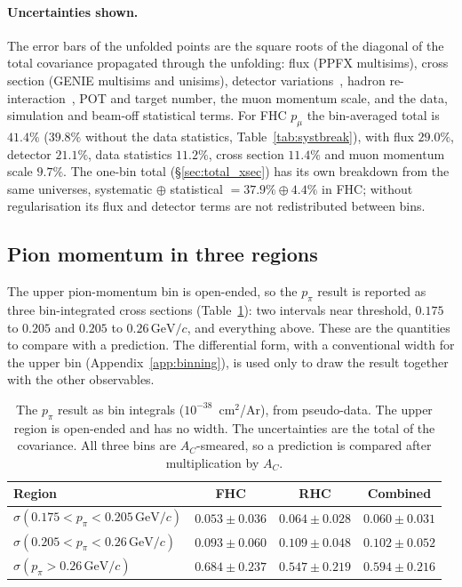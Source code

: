\documentclass[11pt,a4paper]{article}
\newcommand{\GeVc}{\,\text{GeV}\!/c}
\begin{document}
\paragraph{Uncertainties shown.}
The error bars of the unfolded points are the square roots of the diagonal of the total covariance
propagated through the unfolding: flux (PPFX multisims), cross section (GENIE multisims and
unisims), detector variations~\cite{uboone_detvar}, hadron re-interaction~\cite{geant4reweight},
POT and target number, the muon momentum scale, and the data, simulation and beam-off statistical
terms. For FHC $p_\mu$ the bin-averaged total is $41.4\%$ ($39.8\%$ without the data statistics,
Table~\ref{tab:systbreak}), with flux $29.0\%$, detector $21.1\%$, data statistics $11.2\%$, cross
section $11.4\%$ and muon momentum scale $9.7\%$. The
one-bin total (\S\ref{sec:total_xsec}) has its own breakdown from the same universes, systematic
$\oplus$ statistical $=37.9\%\oplus4.4\%$ in FHC; without regularisation its flux and detector
terms are not redistributed between bins.

\subsection{Pion momentum in three regions}
\label{sec:ppi_two_region}

The upper pion-momentum bin is open-ended, so the $p_\pi$ result is reported as three bin-integrated
cross sections (Table~\ref{tab:ppi_partial_main}): two intervals near threshold, $0.175$ to $0.205$
and $0.205$ to $0.26\GeVc$, and everything above. These are the quantities to compare with a
prediction. The differential form, with a conventional width for the upper bin
(Appendix~\ref{app:binning}), is used only to draw the result together with the other observables.

\begin{table}[H]
  \centering
  \caption{The $p_\pi$ result as bin integrals ($10^{-38}$~cm$^2$/Ar), from pseudo-data. The upper
    region is open-ended and has no width. The uncertainties are the total of the covariance. All three
    bins are $A_C$-smeared, so a prediction is compared after multiplication by $A_C$.}
  \label{tab:ppi_partial_main}
  \small
  \begin{tabular}{lccc}
\toprule
Region & FHC & RHC & Combined \\
\midrule
$\sigma(0.175<p_\pi<0.205\GeVc)$ & $0.053\pm0.036$ & $0.064\pm0.028$ & $0.060\pm0.031$ \\
$\sigma(0.205<p_\pi<0.26\GeVc)$  & $0.093\pm0.060$ & $0.109\pm0.048$ & $0.102\pm0.052$ \\
$\sigma(p_\pi>0.26\GeVc)$         & $0.684\pm0.237$ & $0.547\pm0.219$ & $0.594\pm0.216$ \\
\bottomrule
\end{tabular}
\end{table}
\end{document}
